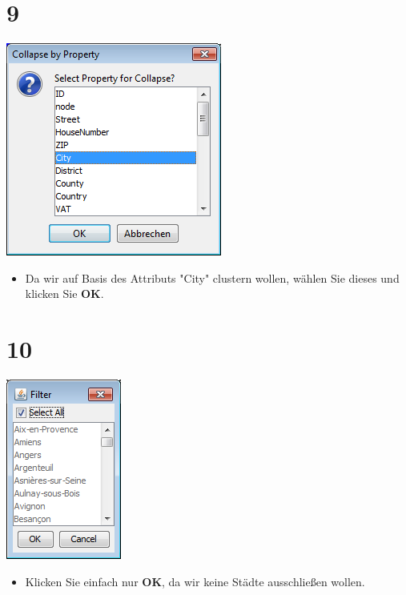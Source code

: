 \documentclass{beamer}
\begin{document}
\section{9}
\begin{frame}
	\begin{center}
  		\includegraphics[height=0.5\textheight]{9.png}
	\end{center}
	\begin{itemize}
		\item Da wir auf Basis des Attributs "City" clustern wollen, wählen Sie dieses und klicken Sie \textbf{OK}.
	\end{itemize}
\end{frame}

\section{10}
\begin{frame}
	\begin{center}
  		\includegraphics[height=0.5\textheight]{10.png}
	\end{center}
	\begin{itemize}
		\item Klicken Sie einfach nur \textbf{OK}, da wir keine Städte ausschließen wollen.
	\end{itemize}
\end{frame}
\end{document}
